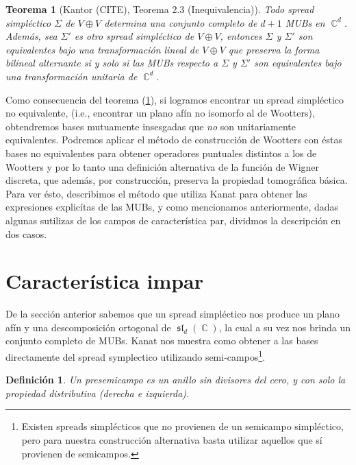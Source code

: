 \documentclass[a4paper]{report}
\DeclareMathOperator{\C}{\mathbb{C}}
\DeclareMathOperator{\Sl}{\mathfrak{sl}}
\newtheorem{definition}{Definición}
\newtheorem{theorem}{Teorema}
\begin{document}
  \begin{theorem}[Kantor (CITE), Teorema 2.3
    (Inequivalencia)]
    \label{thm:kantor_ineq}
    Todo spread simpléctico $\Sigma$ de $V \oplus V$
    determina una conjunto completo de $d+1$ MUBs en
    $\C^{d}$. Además, sea $\Sigma'$ es otro spread
    simpléctico de $V \oplus V$, entonces $\Sigma$ y
    $\Sigma'$ son equivalentes bajo una transformación
    lineal de $V \oplus V$ que preserva la forma bilineal
    alternante si y solo si las MUBs respecto a  $\Sigma$ y
    $\Sigma'$ son equivalentes bajo una transformación
    unitaria de $\C^{d}$.
  \end{theorem}

  Como consecuencia del teorema (\ref{thm:kantor_ineq}), si
  logramos encontrar un spread simpléctico no equivalente,
  (i.e., encontrar un plano afín no isomorfo al de
  Wootters), obtendremos bases mutuamente insesgadas que
  \textit{no} son unitariamente equivalentes. Podremos
  aplicar el método de construcción de Wootters con éstas
  bases no equivalentes para obtener operadores puntuales
  distintos a los de Wootters y por lo tanto una definición
  alternativa de la función de Wigner discreta, que además,
  por construcción, preserva la propiedad tomográfica
  básica. Para ver ésto, describimos el método que utiliza
  Kanat para obtener las expresiones explicítas de las
  MUBs, y como mencionamos anteriormente, dadas algunas
  sutilizas de los campos de característica par, dividmos
  la descripción en dos casos.
  
  \section{Característica impar}

  De la sección anterior sabemos que un spread simpléctico
  nos produce un plano afín y una descomposición ortogonal
  de $\Sl_d(\C)$, la cual a su vez nos brinda un conjunto
  completo de MUBs. Kanat nos muestra como obtener a las
  bases directamente del spread symplectico utilizando
  semi-campos\footnote{Existen spreads simplécticos que no
  provienen de un semicampo simpléctico, pero para nuestra
  construcción alternativa basta utilizar aquellos que sí
  provienen de semicampos.}.

  \begin{definition}
    Un presemicampo es un anillo sin divisores del cero, y
    con solo la propiedad distributiva (derecha e
    izquierda).
  \end{definition}
\end{document}

